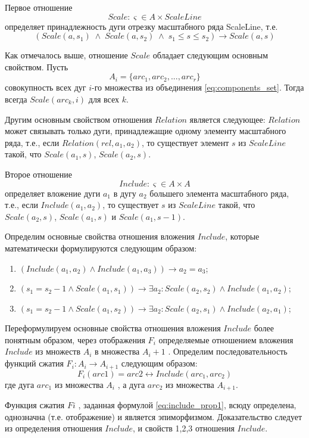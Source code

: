 Первое отношение
$$Scale: \varsigma \in A \times ScaleLine$$  %
определяет принадлежность дуги отрезку масштабного ряда ScaleLine, т.е.
$$(Scale(a, s_1) \;\wedge\; Scale(a, s_2) \;\wedge\; s_1\leq s \leq s_2) \to Scale(a, s) $$

Как отмечалось выше,  отношение  $Scale$  обладает следующим основным свойством. Пусть 
$$A_i = \{arc_1, arc_2, ..., arc_r\}$$ %
совокупность всех дуг $i$-го множества из объединения \ref{eq:components_set}. Тогда всегда  $Scale(arc_k, i)$  для всех $k$.  

Другим основным  свойством отношения  $Relation$ является следующее: $Relation$  может связывать только дуги, принадлежащие одному элементу масштабного ряда, т.е., если $Relation(rel, a_1, a_2)$, то существует элемент  $s$ из  $ScaleLine$ такой, что   $Scale(a_1, s)$,  $Scale(a_2,  s)$.

Второе отношение
$$Include: \varsigma \in A \times A$$  %
определяет вложение дуги $a_1$   в дугу $a_2$   большего элемента масштабного ряда, т.е., если $Include ( a_1, a_2)$,  то  существует  $s$ из  $ScaleLine$ такой, что $Scale(a_2, s)$,  $Scale(a_1,  s)$  и   $Scale(a_1,  s-1)$.

Определим основные свойства отношения вложения  $Include$,  которые математически формулируются следующим образом:
\begin{enumerate}
\item $(Include ( a_1, a_2) \wedge  Include ( a_1, a_3) ) \to a_2 = a_3$; %
\item $( s_1  = s_2 - 1 \wedge  Scale(a_1, s_1)) \to \exists a_2 : Scale(a_2, s_2) \wedge Include(a_1, a_2)$; %
\item $(s_1  = s_2 - 1 \wedge Scale(a_1, s_2)) \to \exists a_2: Scale(a_2, s_1)\wedge Include(a_2, a_1)$; %
\end{enumerate}
Переформулируем  основные свойства отношения вложения $Include$  более понятным образом, через отображения  $F_i$  определяемые отношением вложения  $Include$  из  множеств  $A_i$ в множества $A_i+1$ .     
Определим последовательность функций сжатия  $F_i : A_i \to A_{i+1}$ следующим образом: 
\begin{equation}
F_i(arc1) = arc2 \leftrightarrow Include ( arc_1, arc_2 )
\label{eq:include_prop1}
\end{equation}
где  дуга  $arc_1$  из множества $A_i$  , а  дуга  $arc_2$  из множества $A_{i+1}$.

\begin{lemma}
Функция сжатия  $Fi$ , заданная формулой \ref{eq:include_prop1},   всюду определена, однозначна (т.е. отображение)  и   является эпиморфизмом.
Доказательство следует из определения отношения $Include$,  и свойств 1,2,3 отношения $Include$.
\label{lemma:scale1}
\end{lemma}



